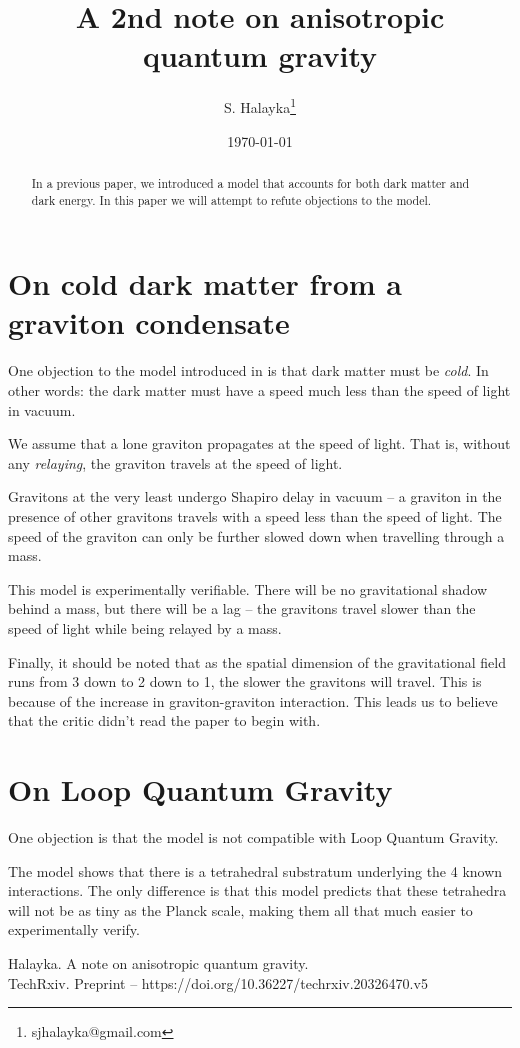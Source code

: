 \documentclass[12pt]{article}
\title{A 2nd note on anisotropic quantum gravity}
\author{S. Halayka\footnote{sjhalayka@gmail.com}}
\date{\today\;\currenttime}
\begin{document}
 
\maketitle

\begin{abstract}
In a previous paper, we introduced a model that accounts for both dark matter and dark energy. In this paper we will attempt to refute objections to the model.
\end{abstract}


\section{On cold dark matter from a graviton condensate}

One objection to the model introduced in \cite{halayka} is that dark matter must be {\textit{cold}}. 
In other words: the dark matter must have a speed much less than the speed of light in vacuum.

We assume that a lone graviton propagates at the speed of light. 
That is, without any {\textit{relaying}}, the graviton travels at the speed of light.

Gravitons at the very least undergo Shapiro delay in vacuum -- a graviton in the presence of other gravitons travels with a speed less than the speed of light.
The speed of the graviton can only be further slowed down when travelling through a mass.

This model is experimentally verifiable. 
There will be no gravitational shadow behind a mass, but there will be a lag -- the gravitons travel slower than the speed of light while being relayed by a mass.

Finally, it should be noted that as the spatial dimension of the gravitational field runs from 3 down to 2 down to 1, the slower the gravitons will travel.
This is because of the increase in graviton-graviton interaction.
This leads us to believe that the critic didn't read the paper to begin with.





\section{On Loop Quantum Gravity}

One objection is that the model is not compatible with Loop Quantum Gravity.

The model shows that there is a tetrahedral substratum underlying the 4 known interactions.
The only difference is that this model predicts that these tetrahedra will not be as tiny as the Planck scale, making them all that much easier to experimentally verify.







\begin{thebibliography}{9}

 Halayka. A note on anisotropic quantum gravity.\\TechRxiv. Preprint -- https://doi.org/10.36227/techrxiv.20326470.v5


\end{thebibliography}
\end{document}
